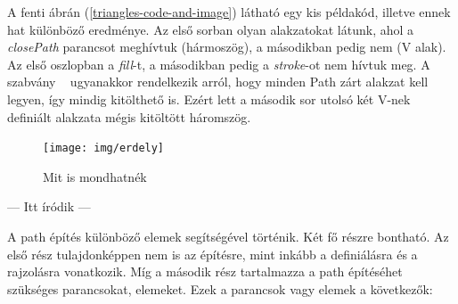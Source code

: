 \documentclass[12pt]{report}
\theoremstyle{definition}
\begin{document}
  A fenti ábrán (\ref{triangles-code-and-image}) látható egy kis példakód,
illetve ennek hat különböző eredménye. Az első sorban olyan alakzatokat látunk,
ahol a \emph{closePath} parancsot meghívtuk (hármoszög), a másodikban pedig nem
(V alak). Az első oszlopban a \emph{fill}-t, a másodikban pedig a
\emph{stroke}-ot nem hívtuk meg. A szabvány ~\cite{Cabanier:14:HCC} ugyanakkor
rendelkezik arról, hogy minden Path zárt alakzat kell legyen, így mindig
kitölthető is. Ezért lett a második sor utolsó két V-nek definiált alakzata
mégis kitöltött háromszög.

  \begin{figure}[!htb]
    \centering
    \texttt{[image: img/erdely]}
    \caption{\label{erdely} Mit is mondhatnék}
  \end{figure}

--- Itt íródik ---

A path építés
különböző elemek segítségével történik. Két fő részre bontható. Az első rész
tulajdonképpen nem is az építésre, mint inkább a definiálásra és a rajzolásra
vonatkozik. Míg a második rész tartalmazza a path építéséhet szükséges
parancsokat, elemeket. Ezek a parancsok vagy elemek a következők:
\end{document}
